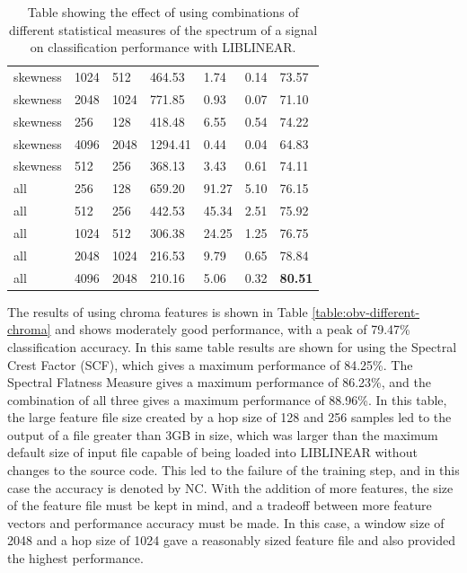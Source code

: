 \begin{table}
\begin{tabular}{|l|l|l|l|l|l|l|}
\hline
skewness & 1024 & 512   &   464.53  &    1.74  &   0.14  &  73.57  \\
skewness & 2048 & 1024  &   771.85  &    0.93  &   0.07  &  71.10  \\
skewness & 256 & 128    &   418.48  &    6.55  &   0.54  &  74.22  \\
skewness & 4096 & 2048  &  1294.41  &    0.44  &   0.04  &  64.83  \\
skewness & 512 & 256    &   368.13  &    3.43  &   0.61  &  74.11  \\
\hline
all & 256 & 128         &   659.20  &   91.27  &   5.10  &  76.15  \\
all & 512 & 256         &   442.53  &   45.34  &   2.51  &  75.92  \\
all & 1024 & 512        &   306.38  &   24.25  &   1.25  &  76.75  \\
all & 2048 & 1024       &   216.53  &    9.79  &   0.65  &  78.84  \\
all & 4096 & 2048       &   210.16  &    5.06  &   0.32  &  \textbf{80.51}  \\
\hline
\end{tabular}
\caption{Table showing the effect of using
  combinations of different statistical measures of the spectrum of a
  signal on classification performance with LIBLINEAR.}
\label{table:obv-different-spectral}
\end{table}

The results of using chroma features is shown in Table
\ref{table:obv-different-chroma} and shows moderately good
performance, with a peak of 79.47\% classification accuracy.  In this
same table results are shown for using the Spectral Crest Factor
(SCF), which gives a maximum performance of 84.25\%.  The Spectral
Flatness Measure gives a maximum performance of 86.23\%, and the
combination of all three gives a maximum performance of 88.96\%.  In
this table, the large feature file size created by a hop size of 128
and 256 samples led to the output of a file greater than 3GB in size,
which was larger than the maximum default size of input file capable
of being loaded into LIBLINEAR without changes to the source code.
This led to the failure of the training step, and in this case the
accuracy is denoted by NC.  With the addition of more features, the
size of the feature file must be kept in mind, and a tradeoff between
more feature vectors and performance accuracy must be made.  In this
case, a window size of 2048 and a hop size of 1024 gave a reasonably
sized feature file and also provided the highest performance.

